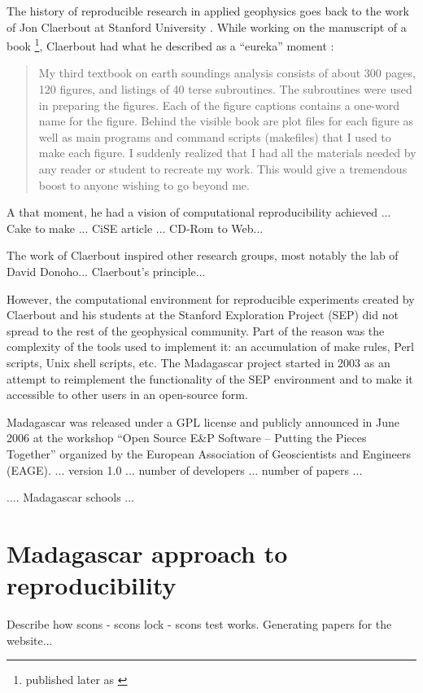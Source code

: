 The history of reproducible research in applied geophysics goes back
to the work of Jon Claerbout at Stanford University
\cite[]{cise}. While working on the manuscript of a book
\footnote{published later as \cite[]{pvi}}, Claerbout had what he
described as a ``eureka'' moment \cite[]{Claerbout.sep.67.139}:
\begin{quote}
My third textbook on earth soundings analysis consists of about 300
pages, 120 figures, and listings of 40 terse subroutines. The
subroutines were used in preparing the figures. Each of the figure
captions contains a one-word name for the figure. Behind the visible
book are plot files for each figure as well as main programs and
command scripts (makefiles) that I used to make each figure. I
suddenly realized that I had all the materials needed by any reader or
student to recreate my work. This would give a tremendous boost to
anyone wishing to go beyond me.
\end{quote}
A that moment, he had a vision of computational reproducibility
achieved ... Cake to make ... CiSE article ... CD-Rom to Web...

The work of Claerbout inspired other research groups, most notably the
lab of David Donoho... Claerbout's principle...

However, the computational environment for reproducible experiments
created by Claerbout and his students at the Stanford Exploration
Project (SEP) did not spread to the rest of the geophysical
community. Part of the reason was the complexity of the tools used to
implement it: an accumulation of make rules, Perl scripts, Unix shell
scripts, etc. The Madagascar project started in 2003 as an attempt to
reimplement the functionality of the SEP environment and to make it
accessible to other users in an open-source form.

Madagascar was released under a GPL license and publicly announced in
June 2006 at the workshop ``Open Source E&P Software – Putting the
Pieces Together'' organized by the European Association of
Geoscientists and Engineers (EAGE). ... version 1.0 ... number of
developers ... number of papers ... 

.... Madagascar schools ...

\section{Madagascar approach to reproducibility}

Describe how scons - scons lock - scons test works. Generating papers
for the website...

